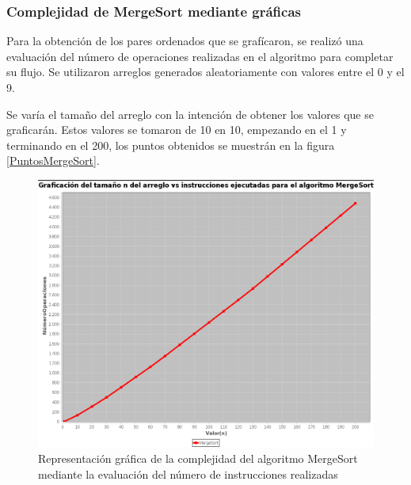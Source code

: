     \subsubsection*{Complejidad de \textbf{MergeSort} mediante gráficas}
    
    Para la obtención de los pares ordenados que se grafícaron, se realizó una evaluación del número de operaciones realizadas en el algoritmo para completar su flujo. Se utilizaron arreglos generados aleatoriamente con valores entre el 0 y el 9.
        
        Se varía el tamaño del arreglo con la intención de obtener los valores que se graficarán. Estos valores se tomaron de 10 en 10, empezando en el 1 y terminando en el 200, los puntos obtenidos se muestrán en la figura \ref{PuntosMergeSort}.\\
        
        \begin{figure}[h!]
            \centering
            \includegraphics[width=17cm]{MergeSort/GraficaMergeSort.png}
            \caption{Representación gráfica de la complejidad del algoritmo MergeSort mediante la evaluación del número de instrucciones realizadas}
            \label{GraficaMergeSort}
        \end{figure}
        

